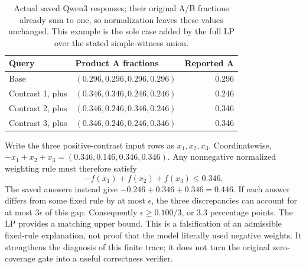 \begin{table}[H]\centering\small
\begin{tabular}{@{}llr@{}}\toprule
Query & Product A fractions & Reported A\\\midrule
Base & $(0.296,0.296,0.296,0.296)$ & 0.296\\
Contrast 1, plus & $(0.346,0.346,0.246,0.246)$ & 0.246\\
Contrast 2, plus & $(0.346,0.246,0.346,0.246)$ & 0.346\\
Contrast 3, plus & $(0.346,0.246,0.246,0.346)$ & 0.346\\\bottomrule
\end{tabular}
\caption{Actual saved Qwen3 responses; their original A/B fractions already sum to one, so normalization leaves these values unchanged. This example is the sole case added by the full LP over the stated simple-witness union.}\label{tab:global-example}\end{table}
Write the three positive-contrast input rows as $x_1,x_2,x_3$. Coordinatewise,
$-x_1+x_2+x_3=(0.346,0.146,0.346,0.346)$. Any nonnegative normalized weighting rule must therefore satisfy
\begin{equation}
-f(x_1)+f(x_2)+f(x_3)\leq0.346.
\end{equation}
The saved answers instead give $-0.246+0.346+0.346=0.446$. If each answer differs from some fixed rule by at most $\epsilon$, the three discrepancies can account for at most $3\epsilon$ of this gap. Consequently $\epsilon\geq0.100/3$, or $3.\overline3$ percentage points. The LP provides a matching upper bound. This is a falsification of an admissible fixed-rule explanation, not proof that the model literally used negative weights. It strengthens the diagnosis of this finite trace; it does not turn the original zero-coverage gate into a useful correctness verifier.
